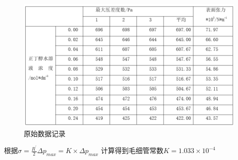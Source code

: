\documentclass[hyperref,a4paper,UTF8]{ctexart}
\begin{document}
 
\begin{figure}
    \centering
    \includegraphics[width=0.75\linewidth]{3.png}
    \caption{原始数据记录}
    \label{fig:enter-label}
\end{figure}
根据$\sigma=\frac{R^{'}}{2} \Delta p_{max}=K\times \Delta p_{max}$ 计算得到毛细管常数$K=1.033 \times 10 ^ {-4}$
\end{document}
